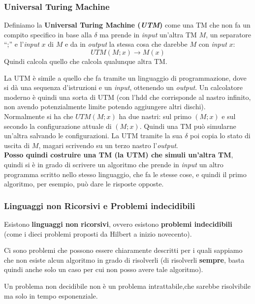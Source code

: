\subsubsection{Universal Turing Machine}
\begin{definizione}
  Definiamo la \textbf{Universal Turing Machine (\textit{UTM})} come una TM che
  non fa un compito specifico in base alla $\delta$ ma prende in \textit{input} un'altra
  TM $M$, un separatore ``;'' e l'\textit{input} $x$ di $M$ e da in \textit{output} la stessa cosa
  che darebbe $M$ con \textit{input} $x$:
  \[UTM(M;x)\to M(x)\]
  Quindi calcola quello che calcola qualunque altra TM.
\end{definizione}
La UTM è simile a quello che fa tramite un linguaggio di programmazione, dove si dà una sequenza d'istruzioni e un \textit{input}, ottenendo un \textit{output}. Un calcolatore moderno è quindi una sorta di UTM (con l'hdd che corrisponde al nastro infinito, non avendo potenzialmente limite potendo aggiungere altri dischi).\\ Normalmente si ha che $UTM(M;x)$ ha due nastri: sul primo $(M;x)$ e sul secondo la configurazione attuale di $(M;x)$. Quindi una TM può simularne un'altra salvando le configurazioni. La UTM tramite la sua $\delta$ poi copia lo stato di uscita di $M$, magari scrivendo su un terzo nastro l'\textit{output}.\\ \textbf{Posso quindi costruire una TM (la UTM) che simuli un'altra TM}, quindi si è in grado di scrivere un algoritmo che prende in \textit{input} un altro programma scritto nello stesso linguaggio, che fa le stesse cose, e quindi il primo algoritmo, per esempio, può dare le risposte opposte.\\
\subsubsection{Linguaggi non Ricorsivi e Problemi indecidibili}
\begin{definizione}
  Esistono \textbf{linguaggi non ricorsivi}, ovvero esistono \textbf{problemi indecidibili} (come i dieci problemi proposti da Hilbert a inizio novecento).
\end{definizione}
Ci sono problemi che possono essere chiaramente descritti per i quali sappiamo
che non esiste alcun algoritmo in grado di risolverli (di risolverli
\textbf{sempre}, basta quindi anche solo un caso per cui non posso avere tale algoritmo). 
\begin{definizione}
  Un problema non decidibile non è un problema intrattabile,che sarebbe risolvibile ma solo in tempo esponenziale.
\end{definizione}
